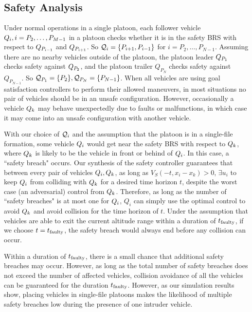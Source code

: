 \subsection{Safety Analysis}
Under normal operations in a single platoon, each follower vehicle $Q_{i},i=P_2,\ldots,P_{M-1}$ in a platoon checks whether it is in the safety BRS with respect to $Q_{P_{i-1}}$ and $Q_{P_{i+1}}$. So $\mathcal{Q}_{i} = \{P_{i+1}, P_{i-1}\}$ for $i=P_2,\ldots,P_{N-1}$. Assuming there are no nearby vehicles outside of the platoon, the platoon leader $Q_{P_1}$ checks safety against $Q_{P_2}$, and the platoon trailer $Q_{P_N}$ checks safety against $Q_{P_{N-1}}$. So $\mathcal{Q}_{P_1}=\{P_2\}, \mathcal{Q}_{P_N}=\{P_{N-1}\}$. When all vehicles are using goal satisfaction controllers to perform their allowed maneuvers, in most situations no pair of vehicles should be in an unsafe configuration. However, occasionally a vehicle $Q_{k}$ may behave unexpectedly due to faults or malfunctions, in which case it may come into an unsafe configuration with another vehicle.

With our choice of $\mathcal{Q}_{i}$ and the assumption that the platoon is in a single-file formation, some vehicle $Q_{i}$ would get near the safety BRS with respect to $Q_{k}$, where $Q_{k}$ is likely to be the vehicle in front or behind of $Q_{i}$. In this case, a ``safety breach" occurs. Our synthesis of the safety controller guarantees that between every pair of vehicles $Q_{i},Q_{k}$, as long as $V_S(-t,x_i- x_k)>0$, $\exists u_i$ to keep $Q_{i}$ from colliding with $Q_{k}$ for a desired time horizon $t$, despite the worst case (an adversarial) control from $Q_{k}$. Therefore, as long as the number of ``safety breaches" is at most one for $Q_{i}$, $Q_i$ can simply use the optimal control to avoid $Q_{k}$ and avoid collision for the time horizon of $t$. Under the assumption that vehicles are able to exit the current altitude range within a duration of $t_\text{faulty}$, if we choose $t=t_\text{faulty}$, the safety breach would always end before any collision can occur. 

Within a duration of $t_\text{faulty}$, there is a small chance that additional safety breaches may occur. However, as long as the total number of safety breaches does not exceed the number of affected vehicles, collision avoidance of all the vehicles can be guaranteed for the duration $t_\text{faulty}$. However, as our simulation results show, placing vehicles in single-file platoons makes the likelihood of multiple safety breaches low during the presence of one intruder vehicle. 

